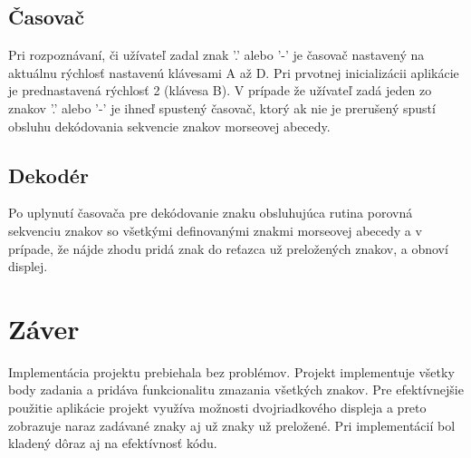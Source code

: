 \documentclass{article}
\begin{document}
	\subsection{Časovač}
	Pri rozpoznávaní, či užívateľ zadal znak '.' alebo '-' je časovač nastavený na aktuálnu rýchlosť nastavenú klávesami A až D. Pri prvotnej inicializácii aplikácie je prednastavená rýchlosť 2 (klávesa B). V prípade že užívateľ zadá jeden zo znakov '.' alebo '-' je ihneď spustený časovač, ktorý ak nie je prerušený spustí obsluhu dekódovania sekvencie znakov morseovej abecedy.
	
	\subsection{Dekodér}
	Po uplynutí časovača pre dekódovanie znaku obsluhujúca rutina porovná sekvenciu znakov so všetkými definovanými znakmi morseovej abecedy a v prípade, že nájde zhodu pridá znak do reťazca už preložených znakov, a obnoví displej.
	
	\section{Záver}
	Implementácia projektu prebiehala bez problémov. Projekt implementuje všetky body zadania a pridáva funkcionalitu zmazania všetkých znakov. Pre efektívnejšie použitie aplikácie projekt využíva možnosti dvojriadkového displeja a preto zobrazuje naraz zadávané znaky aj už znaky už preložené. Pri implementácií bol kladený dôraz aj na efektívnosť kódu.
\end{document}
